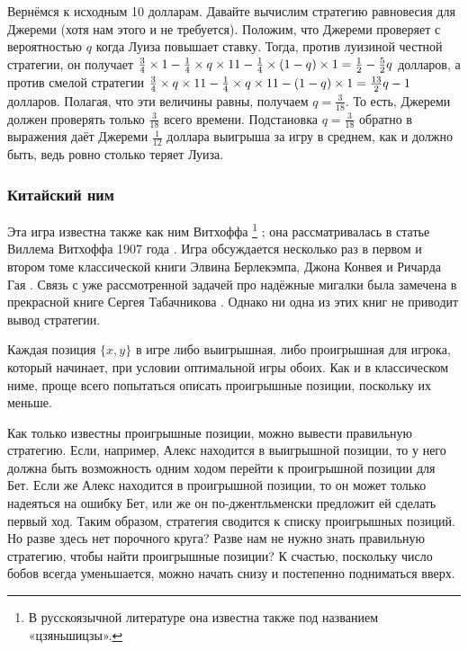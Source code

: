 Вернёмся к исходным 10 долларам.
Давайте вычислим стратегию равновесия для Джереми (хотя нам этого и не требуется).
Положим, что Джереми проверяет с вероятностью $q$ когда Луиза повышает ставку.
Тогда, против луизиной честной стратегии, он получает $\tfrac34 \times 1 \z- \tfrac14 \times q \times 11 \z- \tfrac14 \times (1 - q) \times 1 \z= \tfrac12 \z- \tfrac52q$ долларов,
а против смелой стратегии $\tfrac34 \times q \times 11 \z- \tfrac14 \times q \times 11 \z- (1 - q) \times 1 \z= \tfrac{13}2q \z- 1$ долларов.
Полагая, что эти величины равны, получаем $q = \tfrac3{18}$.
То есть, Джереми должен проверять только $\tfrac3{18}$ всего времени.
Подстановка $q = \tfrac3{18}$ обратно в выражения даёт Джереми $\tfrac1{12}$ доллара выигрыша за игру в среднем, как и должно быть, ведь ровно столько теряет Луиза.

\subsubsection*{Китайский ним}

Эта игра известна также как ним  Витхоффа%
\footnote{В русскоязычной литературе она известна также под названием «цзяньшицзы».\pr}%
; она рассматривалась в статье Виллема Витхоффа 1907 года \cite{60}.
Игра обсуждается несколько раз в первом и втором томе классической книги Элвина Берлекэмпа, Джона Конвея и Ричарда  Гая \cite{4}.
Связь с уже рассмотренной задачей про надёжные мигалки была замечена в прекрасной книге Сергея Табачникова \cite{56}.
Однако ни одна из этих книг не приводит вывод стратегии.

Каждая позиция $\{x, y\}$ в игре либо выигрышная, либо проигрышная для игрока, который начинает, при условии оптимальной игры обоих.
Как и в классическом ниме, проще всего попытаться описать проигрышные позиции, поскольку их меньше.

Как только известны проигрышные позиции, можно вывести правильную стратегию.
Если, например, Алекс находится в выигрышной позиции, то у него должна быть возможность одним ходом перейти к проигрышной позиции для Бет.
Если же Алекс находится в проигрышной позиции, то он может только надеяться на ошибку Бет, или же он по-джентльменски предложит ей сделать первый ход.
Таким образом, стратегия сводится к списку проигрышных позиций.
Но разве здесь нет порочного круга?
Разве нам не нужно знать правильную стратегию, чтобы найти проигрышные позиции?
К счастью, поскольку число бобов всегда уменьшается, можно начать снизу и постепенно подниматься вверх.

